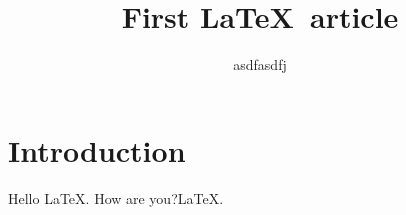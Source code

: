 \documentclass{article}
\title{First \LaTeX\ article}
\author{asdfasdfj}
\begin{document}
  
\section{Introduction}  
Hello \LaTeX. How are you?\LaTeX .
  
\end{document}
